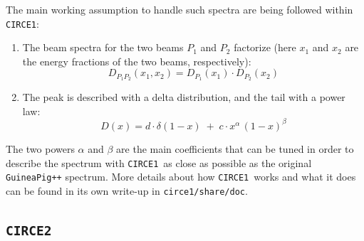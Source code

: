 \documentclass[12pt]{book}
\newcommand{\ttt}[1]{\texttt{#1}}
\newcommand{\circeone}{\ttt{CIRCE1}}
\newcommand{\circetwo}{\ttt{CIRCE2}}
\begin{document}
The main working assumption to handle such spectra are being followed
within \circeone:
\begin{enumerate}
\label{circe1_assumptions}
\item The beam spectra for the two beams $P_1$ and $P_2$ factorize
  (here $x_1$ and $x_2$ are the energy fractions of the two beams,
  respectively):
  \begin{equation*}
    D_{P_1P_2} (x_1, x_2) = D_{P_1} (x_1) \cdot D_{P_2} (x_2)
  \end{equation*}

\item
  The peak is described with a delta distribution, and the tail with a
  power law:
  \begin{equation*}
    D(x) = d \cdot \delta(1-x) \; + \; c \cdot x^\alpha \, (1-x)^\beta
  \end{equation*}
\end{enumerate}
The two powers $\alpha$ and $\beta$ are the main coefficients that can
be tuned in order to describe the spectrum with \circeone\ as close as
possible as the original \ttt{GuineaPig++} spectrum. More details
about how \circeone\ works and what it does can be found in its own
write-up in \ttt{circe1/share/doc}.

\subsection{\circetwo}
\end{document}

